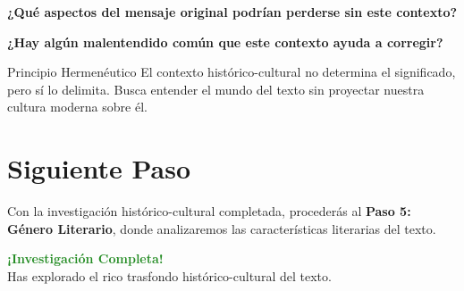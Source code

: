 \documentclass[11pt,a4paper]{article}
\begin{document}
\textbf{¿Qué aspectos del mensaje original podrían perderse sin este contexto?}
\vspace{3cm}

\textbf{¿Hay algún malentendido común que este contexto ayuda a corregir?}
\vspace{3cm}

\begin{infobox}{Principio Hermenéutico}
El contexto histórico-cultural no determina el significado, pero sí lo delimita. Busca entender el mundo del texto sin proyectar nuestra cultura moderna sobre él.
\end{infobox}

\section{Siguiente Paso}

Con la investigación histórico-cultural completada, procederás al \textbf{Paso 5: Género Literario}, donde analizaremos las características literarias del texto.

\vspace{1cm}

\begin{center}
\begin{tcolorbox}[colback=mintgreen!20, colframe=mintgreen, width=0.7\textwidth]
\centering
\textcolor{forestgreen}{\textbf{¡Investigación Completa!}}\\
\textcolor{papergray}{Has explorado el rico trasfondo histórico-cultural del texto.}
\end{tcolorbox}
\end{center}
\end{document}
